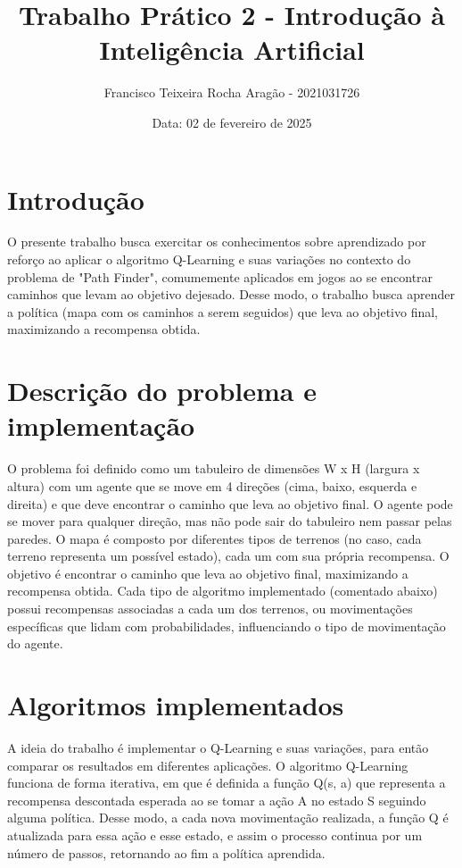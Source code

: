 \documentclass[10pt]{extarticle} %
\title{Trabalho Prático 2 - Introdução à Inteligência Artificial}
\author{Francisco Teixeira Rocha Aragão - 2021031726}
\date{Data: 02 de fevereiro de 2025}
\begin{document}
\maketitle

\section{Introdução}

O presente trabalho busca exercitar os conhecimentos sobre aprendizado por reforço ao aplicar o algoritmo Q-Learning e suas variações no contexto do problema de "Path Finder", comumemente aplicados em jogos ao se encontrar caminhos que levam ao objetivo dejesado. Desse modo, o trabalho busca aprender a política (mapa com os caminhos a serem seguidos) que leva ao objetivo final, maximizando a recompensa obtida.

\section{Descrição do problema e implementação}

O problema foi definido como um tabuleiro de dimensões W x H (largura x altura) com um agente que se move em 4 direções (cima, baixo, esquerda e direita) e que deve encontrar o caminho que leva ao objetivo final. O agente pode se mover para qualquer direção, mas não pode sair do tabuleiro nem passar pelas paredes. O mapa é composto por diferentes tipos de terrenos (no caso, cada terreno representa um possível estado), cada um com sua própria recompensa. O objetivo é encontrar o caminho que leva ao objetivo final, maximizando a recompensa obtida. Cada tipo de algoritmo implementado (comentado abaixo) possui recompensas associadas a cada um dos terrenos, ou movimentações específicas que lidam com probabilidades, influenciando o tipo de movimentação do agente.

\section{Algoritmos implementados}

A ideia do trabalho é implementar o Q-Learning e suas variações, para então comparar os resultados em diferentes aplicações. O algoritmo Q-Learning funciona de forma iterativa, em que é definida a função Q(s, a) que representa a recompensa descontada esperada ao se tomar a ação A no estado S seguindo alguma política. Desse modo, a cada nova movimentação realizada, a função Q é atualizada para essa ação e esse estado, e assim o processo continua por um número de passos, retornando ao fim a política aprendida.
\end{document}
